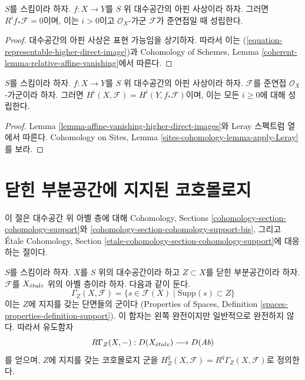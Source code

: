 \begin{lemma}
\label{lemma-affine-vanishing-higher-direct-images}
$S$를 스킴이라 하자. $f : X \to Y$를 $S$ 위 대수공간의 아핀
사상이라 하자. 그러면 $R^if_*\mathcal{F} = 0$이며, 이는
$i > 0$이고 $\mathcal{O}_X$-가군 $\mathcal{F}$가 준연접일 때
성립한다.
\end{lemma}

\begin{proof}
대수공간의 아핀 사상은 표현 가능임을 상기하자. 따라서 이는
(\ref{equation-representable-higher-direct-image})과 Cohomology of Schemes,
Lemma \ref{coherent-lemma-relative-affine-vanishing}에서 따른다.
\end{proof}

\begin{lemma}
\label{lemma-relative-affine-cohomology}
$S$를 스킴이라 하자. $f : X \to Y$를 $S$ 위 대수공간의 아핀
사상이라 하자. $\mathcal{F}$를 준연접 $\mathcal{O}_X$-가군이라 하자.
그러면 $H^i(X, \mathcal{F}) = H^i(Y, f_*\mathcal{F})$이며,
이는 모든 $i \geq 0$에 대해 성립한다.
\end{lemma}

\begin{proof}
Lemma \ref{lemma-affine-vanishing-higher-direct-images}와 Leray 스펙트럼
열에서 따른다. Cohomology on Sites, Lemma
\ref{sites-cohomology-lemma-apply-Leray}를 보라.
\end{proof}






\section{닫힌 부분공간에 지지된 코호몰로지}
\label{section-cohomology-support}

\noindent
이 절은 대수공간 위 아벨 층에 대해 Cohomology, Sections
\ref{cohomology-section-cohomology-support}와
\ref{cohomology-section-cohomology-support-bis}, 그리고
\'Etale Cohomology, Section
\ref{etale-cohomology-section-cohomology-support}에 대응하는 절이다.

\medskip\noindent
$S$를 스킴이라 하자. $X$를 $S$ 위의 대수공간이라 하고
$Z \subset X$를 닫힌 부분공간이라 하자. $\mathcal{F}$를
$X_{\acute{e}tale}$ 위의 아벨 층이라 하자. 다음과 같이 둔다.
$$
\Gamma_Z(X, \mathcal{F}) =
\{s \in \mathcal{F}(X) \mid \text{Supp}(s) \subset Z\}
$$
이는 $Z$에 지지를 갖는 단면들의 군이다
(Properties of Spaces, Definition
\ref{spaces-properties-definition-support}). 이 함자는 왼쪽 완전이지만
일반적으로 완전하지 않다. 따라서 유도함자
$$
R\Gamma_Z(X, -) : D(X_{\acute{e}tale}) \longrightarrow D(\textit{Ab})
$$
를 얻으며, $Z$에 지지를 갖는 코호몰로지 군을
$H^q_Z(X, \mathcal{F}) = R^q\Gamma_Z(X, \mathcal{F})$로 정의한다.

